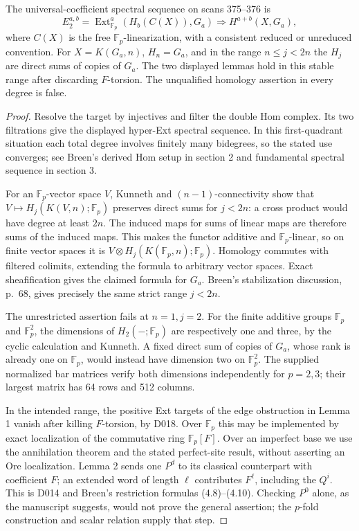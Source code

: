 \begin{proposition}\label{sa08:D020}
The universal-coefficient spectral sequence on scans 375--376 is
\[
 E_2^{a,b}=\operatorname{Ext}_{\mathbb F_p}^a
          (H_b(C(X)),G_a)
 \Longrightarrow H^{a+b}(X,G_a),
\]
where $C(X)$ is the free $\mathbb F_p$-linearization, with a
consistent reduced or unreduced convention. For $X=K(G_a,n)$,
$H_n=G_a$, and in the range $n\leq j<2n$ the $H_j$ are direct
sums of copies of $G_a$. The two displayed lemmas hold in this
stable range after discarding $F$-torsion. The unqualified
homology assertion in every degree is false.
\end{proposition}
\begin{proof}
Resolve the target by injectives and filter the double Hom
complex. Its two filtrations give the displayed hyper-Ext
spectral sequence. In this first-quadrant situation each total
degree involves finitely many bidegrees, so the stated use
converges; see Breen's derived Hom setup in section 2 and
fundamental spectral sequence in section 3.

For an $\mathbb F_p$-vector space $V$, Kunneth and
$(n-1)$-connectivity show that
$V\mapsto H_j(K(V,n);\mathbb F_p)$ preserves direct sums for
$j<2n$: a cross product would have degree at least $2n$.
The induced maps for sums of linear maps are therefore sums of
the induced maps. This makes the functor additive and
$\mathbb F_p$-linear, so on finite vector spaces it is
$V\otimes H_j(K(\mathbb F_p,n);\mathbb F_p)$.
Homology commutes with filtered colimits, extending the formula
to arbitrary vector spaces. Exact sheafification gives the
claimed formula for $G_a$. Breen's stabilization discussion,
p.~68, gives precisely the same strict range $j<2n$.

The unrestricted assertion fails at $n=1,j=2$.
For the finite additive groups $\mathbb F_p$ and
$\mathbb F_p^2$, the dimensions of $H_2(-;\mathbb F_p)$ are
respectively one and three, by the cyclic calculation and
Kunneth. A fixed direct sum of copies of $G_a$, whose rank is
already one on $\mathbb F_p$, would instead have dimension two
on $\mathbb F_p^2$. The supplied normalized bar matrices verify
both dimensions independently for $p=2,3$; their largest
matrix has 64 rows and 512 columns.

In the intended range, the positive Ext targets of the edge
obstruction in Lemma 1 vanish after killing $F$-torsion, by D018.
Over $\mathbb F_p$ this may be implemented by exact localization
of the commutative ring $\mathbb F_p[F]$. Over an imperfect base
we use the annihilation theorem and the stated perfect-site
result, without asserting an Ore localization.
Lemma 2 sends one $P^d$ to its classical counterpart with
coefficient $F$; an extended word of length $\ell$ contributes
$F^\ell$, including the $Q^i$. This is D014 and Breen's
restriction formulas (4.8)--(4.10). Checking $P^0$ alone, as the
manuscript suggests, would not prove the general assertion;
the $p$-fold construction and scalar relation supply that step.
\end{proof}

